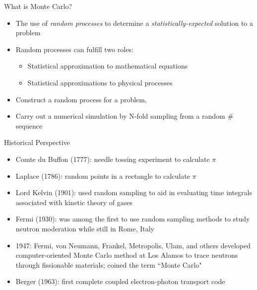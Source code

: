 \documentclass[xcolor=x11names,compress, handout]{beamer}
\renewcommand{\(}{\begin{columns}}
\renewcommand{\)}{\end{columns}}
\newcommand{\<}[1]{\begin{column}{#1}}
\renewcommand{\>}{\end{column}}
\begin{document}


\begin{frame}{What is Monte Carlo?}

  \begin{itemize}
  \item The use of \textit{random processes} to determine a 
        \textit{statistically-expected} solution to a problem
  \vspace*{1em}
  \item Random processes can fulfill two roles:
  \begin{itemize}
    \item Statistical approximation to \alert{mathematical equations}
    \item Statistical approximations to \alert{physical processes}
  \end{itemize}   
 \vspace*{1em} 
  \item Construct a random process for a problem, 
  \item Carry out a numerical simulation by N-fold sampling from a random \# sequence
\end{itemize}
\end{frame}


\begin{frame}{Historical Perspective}

  \begin{itemize}
  \item Comte du Buffon (1777): needle tossing experiment to calculate $\pi$
  \pause
  \item Laplace (1786): random points in a rectangle to calculate $\pi$
    \pause
  \item Lord Kelvin (1901): used random sampling to aid in evaluating time integrals associated with kinetic theory of gases
    \pause
  \item Fermi (1930): was among the first to use random sampling methods to study neutron moderation while still in Rome, Italy
    \pause
  \item 1947: Fermi, von Neumann, Frankel, Metropolis, Ulam, and others developed computer-oriented Monte Carlo method at Los Alamos to trace neutrons through fissionable materials; coined the term ``Monte Carlo"
    \pause
  \item Berger (1963): first complete coupled electron-photon transport code 
\end{itemize}
\end{frame}
\end{document}
